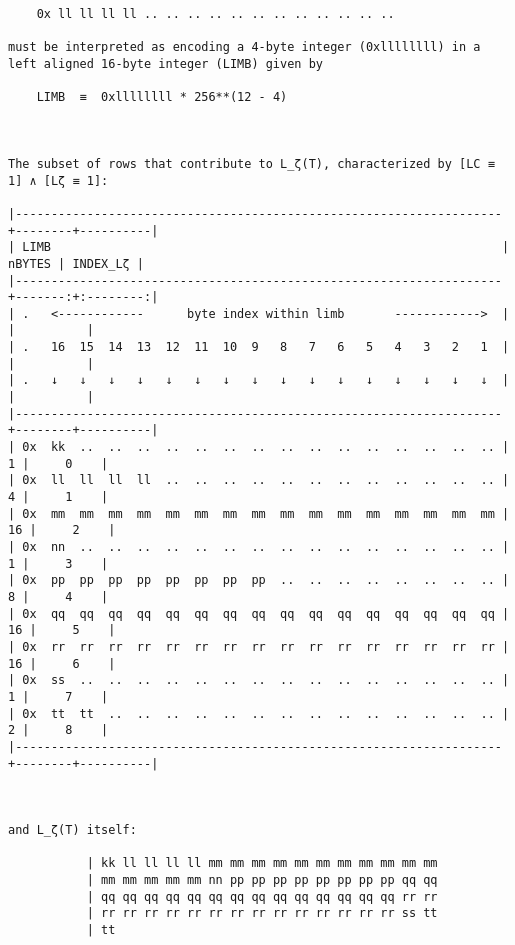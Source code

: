 \documentclass[varwidth=\maxdimen,margin=0.5cm,multi={verbatim}]{standalone}
\begin{document}
\begin{verbatim}
    0x ll ll ll ll .. .. .. .. .. .. .. .. .. .. .. ..

must be interpreted as encoding a 4-byte integer (0xllllllll) in a left aligned 16-byte integer (LIMB) given by

    LIMB  ≡  0xllllllll * 256**(12 - 4)



The subset of rows that contribute to L_ζ(T), characterized by [LC ≡ 1] ∧ [Lζ ≡ 1]:

|--------------------------------------------------------------------+--------+----------|
| LIMB                                                               | nBYTES | INDEX_Lζ |
|--------------------------------------------------------------------+-------:+:--------:|
| .   <------------      byte index within limb       ------------>  |        |          |
| .   16  15  14  13  12  11  10  9   8   7   6   5   4   3   2   1  |        |          |
| .   ↓   ↓   ↓   ↓   ↓   ↓   ↓   ↓   ↓   ↓   ↓   ↓   ↓   ↓   ↓   ↓  |        |          |
|--------------------------------------------------------------------+--------+----------|
| 0x  kk  ..  ..  ..  ..  ..  ..  ..  ..  ..  ..  ..  ..  ..  ..  .. |      1 |     0    |
| 0x  ll  ll  ll  ll  ..  ..  ..  ..  ..  ..  ..  ..  ..  ..  ..  .. |      4 |     1    |
| 0x  mm  mm  mm  mm  mm  mm  mm  mm  mm  mm  mm  mm  mm  mm  mm  mm |     16 |     2    |
| 0x  nn  ..  ..  ..  ..  ..  ..  ..  ..  ..  ..  ..  ..  ..  ..  .. |      1 |     3    |
| 0x  pp  pp  pp  pp  pp  pp  pp  pp  ..  ..  ..  ..  ..  ..  ..  .. |      8 |     4    |
| 0x  qq  qq  qq  qq  qq  qq  qq  qq  qq  qq  qq  qq  qq  qq  qq  qq |     16 |     5    |
| 0x  rr  rr  rr  rr  rr  rr  rr  rr  rr  rr  rr  rr  rr  rr  rr  rr |     16 |     6    |
| 0x  ss  ..  ..  ..  ..  ..  ..  ..  ..  ..  ..  ..  ..  ..  ..  .. |      1 |     7    |
| 0x  tt  tt  ..  ..  ..  ..  ..  ..  ..  ..  ..  ..  ..  ..  ..  .. |      2 |     8    |
|--------------------------------------------------------------------+--------+----------|



and L_ζ(T) itself:

           | kk ll ll ll ll mm mm mm mm mm mm mm mm mm mm mm
           | mm mm mm mm mm nn pp pp pp pp pp pp pp pp qq qq
           | qq qq qq qq qq qq qq qq qq qq qq qq qq qq rr rr
           | rr rr rr rr rr rr rr rr rr rr rr rr rr rr ss tt
           | tt
\end{verbatim}
\end{document}
